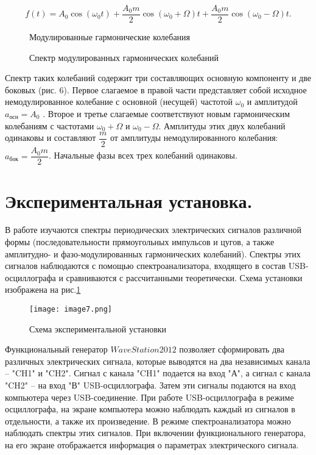 \documentclass[a4paper,12pt]{article} %
\begin{document}
\begin{enumerate}
\begin{equation}\label{a}
	f(t)=A_{0}\cos(\omega_{0} t)+\dfrac{A_{0}m}{2}\cos(\omega_{0}+\Omega)t+\dfrac{A_{0}m}{2}\cos(\omega_{0}-\Omega)t.
\end{equation}
		
\begin{figure}[h]
    \begin{minipage}[h]{0.5\linewidth}
	\caption{Модулированные гармонические колебания}
    \end{minipage}
    \begin{minipage}[h]{0.5\linewidth}
	\caption{Спектр модулированных гармонических колебаний}
    \end{minipage}
\end{figure}
		
Спектр таких колебаний содержит три составляющих  основную компоненту и две боковых (рис. 6). Первое слагаемое в правой части представляет собой исходное немодулированное колебание с основной (несущей) частотой $\omega_{0}$ и амплитудой $a_{осн} = A_{0}$ . Второе и третье слагаемые соответствуют новым гармоническим колебаниям с частотами $\omega_{0} + \Omega$ и $\omega_{0} - \Omega$. Амплитуды этих двух колебаний одинаковы и составляют $\dfrac{m}{2}$ от амплитуды немодулированного колебания: $a_{бок} = \dfrac{A_{0}m}{2}$. Начальные фазы всех трех колебаний одинаковы.

\end{enumerate}

\section{Экспериментальная установка.}
В работе изучаются спектры периодических электрических сигналов 
различной формы (последовательности прямоугольных импульсов и цугов, 
а также амплитудно- и фазо-модулированных гармонических колебаний). 
Спектры этих сигналов наблюдаются с помощью спектроанализатора, входящего в состав USB-осциллографа и сравниваются с рассчитанными теоретически. Схема установки изображена на рис.\ref{ustanovka}

\begin{figure}[h]
    \centering
    \texttt{[image: image7.png]}
    \caption{Схема экспериментальной установки}
    \label{ustanovka}
\end{figure}

Функциональный генератор $WaveStation 2012$ позволяет сформировать два 
различных электрических сигнала, которые выводятся на два независимых канала – "CH1" и "CH2". Сигнал с канала "CH1" подается на вход "А", а сигнал с канала "CH2" – на вход "В" USB-осциллографа. Затем эти сигналы подаются на вход компьютера через USB-соединение. При работе USB-осциллографа в режиме осциллографа, на экране компьютера можно наблюдать каждый из сигналов в отдельности, а также их произведение. В режиме спектроанализатора можно наблюдать спектры этих сигналов.
При включении функционального генератора, на его экране отображается информация о параметрах электрического сигнала.
\end{document}
